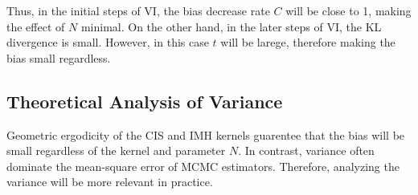 Thus, in the initial steps of VI, the bias decrease rate \(C\) will be close to 1, making the effect of \(N\) minimal.
On the other hand, in the later steps of VI, the KL divergence is small.
However, in this case \(t\) will be larege, therefore making the bias small regardless.

\subsection{Theoretical Analysis of Variance}
Geometric ergodicity of the CIS and IMH kernels guarentee that the bias will be small regardless of the kernel and parameter \(N\).
In contrast, variance often dominate the mean-square error of MCMC estimators.
Therefore, analyzing the variance will be more relevant in practice.




